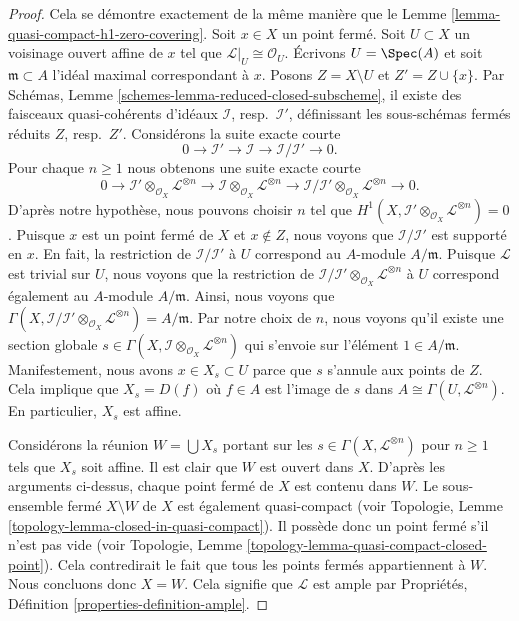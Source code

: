 \begin{proof}
Cela se démontre exactement de la même manière que le Lemme
\ref{lemma-quasi-compact-h1-zero-covering}. Soit $x \in X$ un point fermé. Soit
$U \subset X$ un voisinage ouvert affine de $x$ tel que
$\mathcal{L}|_U \cong \mathcal{O}_U$. Écrivons $U = \Spec(A)$ et soit
$\mathfrak m \subset A$ l'idéal maximal correspondant à $x$. Posons
$Z = X \setminus U$ et $Z' = Z \cup \{x\}$. Par Schémas, Lemme
\ref{schemes-lemma-reduced-closed-subscheme}, il existe des faisceaux
quasi-cohérents d'idéaux $\mathcal{I}$, resp.\ $\mathcal{I}'$, définissant les
sous-schémas fermés réduits $Z$, resp.\ $Z'$.
Considérons la suite exacte courte
$$
0 \to \mathcal{I}' \to \mathcal{I} \to \mathcal{I}/\mathcal{I}' \to 0.
$$
Pour chaque $n \geq 1$ nous obtenons une suite exacte courte
$$
0 \to \mathcal{I}' \otimes_{\mathcal{O}_X} \mathcal{L}^{\otimes n}
\to \mathcal{I} \otimes_{\mathcal{O}_X} \mathcal{L}^{\otimes n} \to
\mathcal{I}/\mathcal{I}' \otimes_{\mathcal{O}_X} \mathcal{L}^{\otimes n} \to 0.
$$
D'après notre hypothèse, nous pouvons choisir $n$ tel que
$H^1(X, \mathcal{I}' \otimes_{\mathcal{O}_X} \mathcal{L}^{\otimes n}) = 0$.
Puisque $x$ est un point
fermé de $X$ et $x \not \in Z$, nous voyons que $\mathcal{I}/\mathcal{I}'$ est
supporté en $x$. En fait, la restriction de $\mathcal{I}/\mathcal{I'}$ à $U$
correspond au $A$-module $A/\mathfrak m$. Puisque $\mathcal{L}$ est trivial sur
$U$, nous voyons que la restriction de $\mathcal{I}/\mathcal{I}' \otimes_{\mathcal{O}_X} \mathcal{L}^{\otimes n}$ à $U$ correspond également au
$A$-module $A/\mathfrak m$. Ainsi, nous voyons que
$\Gamma(X, \mathcal{I}/\mathcal{I'} \otimes_{\mathcal{O}_X}
\mathcal{L}^{\otimes n}) = A/\mathfrak m$.
Par notre choix de $n$, nous voyons qu'il existe une section globale
$s \in \Gamma(X, \mathcal{I} \otimes_{\mathcal{O}_X} \mathcal{L}^{\otimes n})$
qui s'envoie sur l'élément $1 \in A/\mathfrak m$. Manifestement, nous avons
$x \in X_s \subset U$ parce que $s$ s'annule aux points de $Z$. Cela implique
que $X_s = D(f)$ où $f \in A$ est l'image de $s$ dans
$A \cong \Gamma(U, \mathcal{L}^{\otimes n})$. En particulier, $X_s$ est affine.

\medskip\noindent
Considérons la réunion $W = \bigcup X_s$ portant sur les
$s \in \Gamma(X, \mathcal{L}^{\otimes n})$ pour $n \geq 1$ tels que $X_s$ soit
affine. Il est clair que $W$ est ouvert dans $X$. D'après les arguments
ci-dessus, chaque
point fermé de $X$ est contenu dans $W$. Le sous-ensemble fermé $X \setminus W$
de $X$ est également quasi-compact (voir Topologie, Lemme
\ref{topology-lemma-closed-in-quasi-compact}). Il possède donc un point fermé
s'il n'est pas vide (voir Topologie, Lemme
\ref{topology-lemma-quasi-compact-closed-point}). Cela contredirait le fait que
tous les points fermés appartiennent à $W$. Nous concluons donc $X = W$. Cela
signifie
que $\mathcal{L}$ est ample par Propriétés, Définition
\ref{properties-definition-ample}.
\end{proof}


